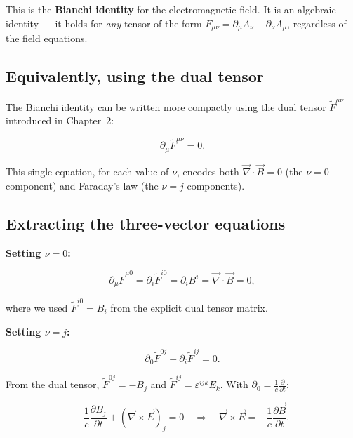 This is the \textbf{Bianchi identity} for the electromagnetic field. It is an algebraic identity --- it holds for \emph{any} tensor of the form $F_{\mu\nu} = \partial_\mu A_\nu - \partial_\nu A_\mu$, regardless of the field equations.

\subsection{Equivalently, using the dual tensor}

The Bianchi identity can be written more compactly using the dual tensor $\widetilde{F}^{\mu\nu}$ introduced in Chapter~2:

\begin{equation}
\boxed{\partial_\mu \widetilde{F}^{\mu\nu} = 0.}
\end{equation}

This single equation, for each value of $\nu$, encodes both $\vec{\nabla}\cdot\vec{B} = 0$ (the $\nu = 0$ component) and Faraday's law (the $\nu = j$ components).

\subsection{Extracting the three-vector equations}

\textbf{Setting $\nu = 0$:}

\begin{equation}
\partial_\mu \widetilde{F}^{\mu 0} = \partial_i \widetilde{F}^{i0} = \partial_i B^i = \vec{\nabla}\cdot\vec{B} = 0,
\end{equation}

where we used $\widetilde{F}^{i0} = B_i$ from the explicit dual tensor matrix.

\textbf{Setting $\nu = j$:}

\begin{equation}
\partial_0 \widetilde{F}^{0j} + \partial_i \widetilde{F}^{ij} = 0.
\end{equation}

From the dual tensor, $\widetilde{F}^{0j} = -B_j$ and $\widetilde{F}^{ij} = \varepsilon^{ijk}E_k$. With $\partial_0 = \frac{1}{c}\frac{\partial}{\partial t}$:

\begin{equation}
-\frac{1}{c}\frac{\partial B_j}{\partial t} + (\vec{\nabla}\times\vec{E})_j = 0 \quad \Longrightarrow \quad \vec{\nabla}\times\vec{E} = -\frac{1}{c}\frac{\partial\vec{B}}{\partial t}.
\end{equation}

